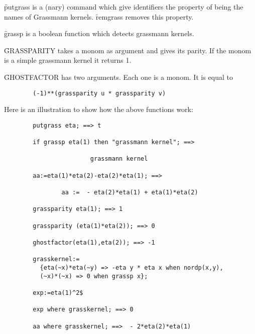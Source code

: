 \hypertarget{command:PUTGRASS}{}
\hypertarget{command:REMGRASS}{}
\f{putgrass} is a (nary) command which give identifiers the property
of being the names of Grassmann kernels. \f{remgrass} removes this property.

\hypertarget{operator:GRASSP}{}
\f{grassp} is a boolean function which detects grassmann kernels.

\hypertarget{operator:GRASSPARITY}{}
\f{GRASSPARITY} takes a monom as argument and gives its parity.
If the monom is a simple grassmann kernel it returns 1.

\hypertarget{operator:GHOSTFACTOR}{}
\f{GHOSTFACTOR} has two arguments. Each one is a monom. It is equal to
\begin{verbatim}
        (-1)**(grassparity u * grassparity v)
\end{verbatim}
Here is an illustration to show how the above functions work:
\begin{verbatim}
        putgrass eta; ==> t

        if grassp eta(1) then "grassmann kernel"; ==>

                        grassmann kernel

        aa:=eta(1)*eta(2)-eta(2)*eta(1); ==>

                aa :=  - eta(2)*eta(1) + eta(1)*eta(2)

        grassparity eta(1); ==> 1

        grassparity (eta(1)*eta(2)); ==> 0

        ghostfactor(eta(1),eta(2)); ==> -1

        grasskernel:=
          {eta(~x)*eta(~y) => -eta y * eta x when nordp(x,y),
          (~x)*(~x) => 0 when grassp x};

        exp:=eta(1)^2$

        exp where grasskernel; ==> 0

        aa where grasskernel; ==>  - 2*eta(2)*eta(1)
\end{verbatim}
